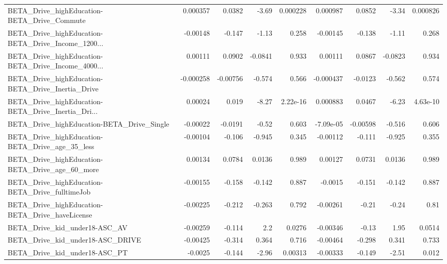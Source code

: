 \begin{tabular}{lrrrrrrrr}
BETA\_Drive\_highEducation-BETA\_Drive\_Commute        &    0.000357 &       0.0382 &    -3.69 & 0.000228 &   0.000987 &      0.0852 &        -3.34 &      0.000826 \\
BETA\_Drive\_highEducation-BETA\_Drive\_Income\_1200... &    -0.00148 &       -0.147 &    -1.13 &    0.258 &   -0.00145 &      -0.138 &        -1.11 &         0.268 \\
BETA\_Drive\_highEducation-BETA\_Drive\_Income\_4000... &     0.00111 &       0.0902 &  -0.0841 &    0.933 &    0.00111 &      0.0867 &      -0.0823 &         0.934 \\
BETA\_Drive\_highEducation-BETA\_Drive\_Inertia\_Drive  &   -0.000258 &     -0.00756 &   -0.574 &    0.566 &  -0.000437 &     -0.0123 &       -0.562 &         0.574 \\
BETA\_Drive\_highEducation-BETA\_Drive\_Inertia\_Dri... &     0.00024 &        0.019 &    -8.27 & 2.22e-16 &   0.000883 &      0.0467 &        -6.23 &      4.63e-10 \\
BETA\_Drive\_highEducation-BETA\_Drive\_Single         &    -0.00022 &      -0.0191 &    -0.52 &    0.603 &  -7.09e-05 &    -0.00598 &       -0.516 &         0.606 \\
BETA\_Drive\_highEducation-BETA\_Drive\_age\_35\_less    &    -0.00104 &       -0.106 &   -0.945 &    0.345 &   -0.00112 &      -0.111 &       -0.925 &         0.355 \\
BETA\_Drive\_highEducation-BETA\_Drive\_age\_60\_more    &     0.00134 &       0.0784 &   0.0136 &    0.989 &    0.00127 &      0.0731 &       0.0136 &         0.989 \\
BETA\_Drive\_highEducation-BETA\_Drive\_fulltimeJob    &    -0.00155 &       -0.158 &   -0.142 &    0.887 &    -0.0015 &      -0.151 &       -0.142 &         0.887 \\
BETA\_Drive\_highEducation-BETA\_Drive\_haveLicense    &    -0.00225 &       -0.212 &   -0.263 &    0.792 &   -0.00261 &       -0.21 &        -0.24 &          0.81 \\
BETA\_Drive\_kid\_under18-ASC\_AV                      &    -0.00259 &       -0.114 &      2.2 &   0.0276 &   -0.00346 &       -0.13 &         1.95 &        0.0514 \\
BETA\_Drive\_kid\_under18-ASC\_DRIVE                   &    -0.00425 &       -0.314 &    0.364 &    0.716 &   -0.00464 &      -0.298 &        0.341 &         0.733 \\
BETA\_Drive\_kid\_under18-ASC\_PT                      &     -0.0025 &       -0.144 &    -2.96 &  0.00313 &   -0.00333 &      -0.149 &        -2.51 &         0.012 \\

\end{tabular}
